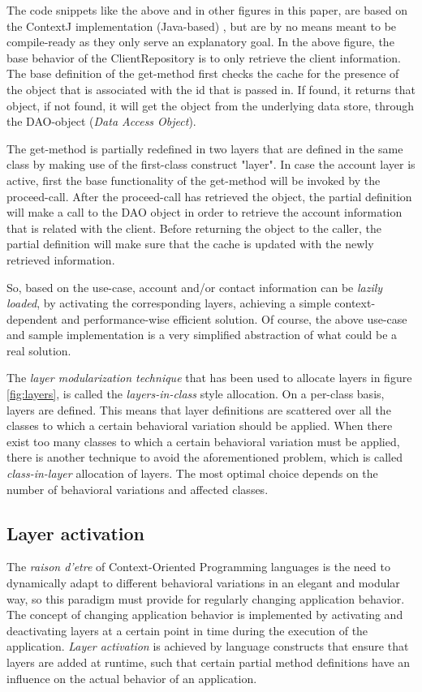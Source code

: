 \documentclass{acm_proc_article-sp}
\begin{document}
The code snippets like the above and in other figures in this paper, are based on the ContextJ implementation (Java-based) \cite{Appeltauer:2009:IDC:1562112.1562117}, but are by no means meant to be compile-ready as they only serve an explanatory goal. In the above figure, the base behavior of the ClientRepository is to only retrieve the client information. The base definition of the get-method first checks the cache for the presence of the object that is associated with the id that is passed in. If found, it returns that object, if not found, it will get the object from the underlying data store, through the DAO-object (\textit{Data Access Object}). 

The get-method is partially redefined in two layers that are defined in the same class by making use of the first-class construct "layer". In case the account layer is active, first the base functionality of the get-method will be invoked by the proceed-call. After the proceed-call has retrieved the object, the partial definition will make a call to the DAO object in order to retrieve the account information that is related with the client. Before returning the object to the caller, the partial definition will make sure that the cache is updated with the newly retrieved information. 

So, based on the use-case, account and/or contact information can be \textit{lazily loaded}, by activating the corresponding layers, achieving a simple context-dependent and performance-wise efficient solution. Of course, the above use-case and sample implementation is a very simplified abstraction of what could be a real solution.

The \textit{layer modularization technique }that has been used to allocate layers in figure \ref{fig:layers}, is called the \textit{layers-in-class} style allocation. On a per-class basis, layers are defined. This means that layer definitions are scattered over all the classes to which a certain behavioral variation should be applied. When there exist too many classes to which a certain behavioral variation must be applied, there is another technique to avoid the aforementioned problem, which is called \textit{class-in-layer} allocation of layers. The most optimal choice depends on the number of behavioral variations and affected classes.

\subsection{Layer activation}
\label{sec:layer_activation}
The \textit{raison d'etre} of Context-Oriented Programming languages is the need to dynamically adapt to different behavioral variations in an elegant and modular way, so this paradigm must provide for regularly changing application behavior. The concept of changing  application behavior is implemented by activating and deactivating layers at a certain point in time during the execution of the application. \textit{Layer activation} is achieved by language constructs that ensure that layers are added at runtime, such that certain partial method definitions have an influence on the actual behavior of an application. 
\end{document}
